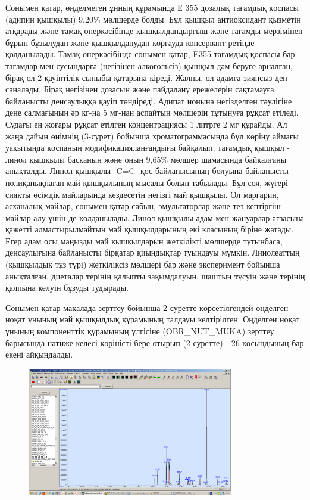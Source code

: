 Сонымен қатар, өңделмеген ұнның құрамында Е 355 дозалық тағамдық қоспасы
(адипин қышқылы) 9,20\% мөлшерде болды. Бұл қышқыл антиоксидант қызметін
атқарады және тамақ өнеркәсібінде қышқылдандырғыш және тағамды
мерзімінен бұрын бұзылудан және қышқылданудан қорғауда консервант
ретінде қолданылады. Тамақ өнеркәсібінде сонымен қатар, E355 тағамдық
қоспасы бар тағамдар мен сусындарға (негізінен алкогольсіз) қышқыл дәм
беруге арналған, бірақ ол 2-қауіптілік сыныбы қатарына кіреді. Жалпы, ол
адамға зиянсыз деп саналады. Бірақ негізінен дозасын және пайдалану
ережелерін сақтамауға байланысты денсаулыққа қауіп төндіреді. Адипат
ионына негізделген тәулігіне дене салмағының әр кг-на 5 мг-нан аспайтын
мөлшерін тұтынуға рұқсат етіледі. Судағы ең жоғары рұқсат етілген
концентрациясы 1 литрге 2 мг құрайды. Ал жаңа дайын өнімнің (3-сурет)
бойынша хроматограммасында бұл көріну аймағы уақытында қоспаның
модификацияланғандығы байқалып, тағамдық қышқыл - линол қышқылы басқанын
және оның 9,65\% мөлшер шамасында байқалғаны анықталды. Линол қышқылы
-C=C- қос байланысының болуына байланысты полиқанықпаған май қышқылының
мысалы болып табылады. Бұл соя, жүгері сияқты өсімдік майларында
кездесетін негізгі май қышқылы. Ол маргарин, асханалық майлар, сонымен
қатар сабын, эмульгаторлар және тез кептіргіш майлар алу үшін де
қолданылады. Линол қышқылы адам мен жануарлар ағзасына қажетті
алмастырылмайтын май қышқылдарының екі класының біріне жатады. Егер адам
осы маңызды май қышқылдарын жеткілікті мөлшерде тұтынбаса, денсаулығына
байланысты бірқатар қиындықтар туындауы мүмкін. Линолеаттың (қышқылдық
тұз түрі) жеткіліксіз мөлшері бар және эксперимент бойынша анықталған,
диеталар терінің қалыпты зақымдалуын, шаштың түсуін және терінің қалпына
келуін бұзуды тудырады.

Сонымен қатар мақалада зерттеу бойынша 2-суретте көрсетілгендей өңделген
ноқат ұнының май қышқылдық құрамының талдауы келтірілген. Өңделген ноқат
ұнының компоненттік құрамының үлгісіне (OBR\_NUT\_MUKA) зерттеу
барысында нәтиже келесі көріністі бере отырып (2-суретте) - 26
қосындының бар екені айқындалды.

\begin{figure}[H]
	\centering
	\includegraphics[width=0.8\textwidth]{media/pish/image14}
	\caption*{}
\end{figure}


